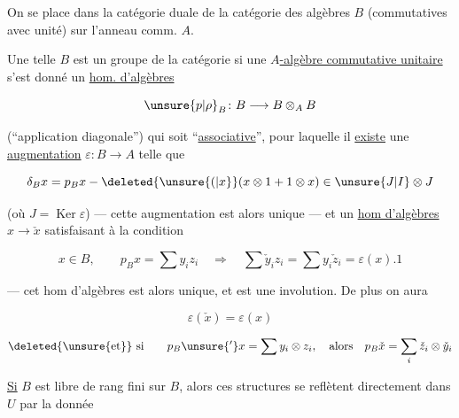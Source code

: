 


On se place dans la catégorie duale de la catégorie des algèbres $B$ (commutatives avec unité) sur l'anneau comm. $A$.


Une telle $B$ est un groupe de la catégorie si  une \uline{$A$-algèbre commutative unitaire} s'est donné un \uline{hom. d'algèbres}

\[
\unsure{p|\rho}_{B}\colon B\longrightarrow B\otimes_A B
\]

(``application diagonale'') qui soit ``\uline{associative}'', pour laquelle il \uline{existe} une \uline{augmentation}  $\varepsilon:B\to A$  telle que

\[
\delta_B x=p_Bx-\deleted{\unsure{( |x}}(x\otimes1+1\otimes x)\in\unsure{J|I}\otimes J
\]

(où $J=\operatorname{Ker}\varepsilon$) --- cette augmentation est alors unique --- et un \uline{hom d'algèbres} $x\longrightarrow\check{x}$ satisfaisant à la condition

\[
x\in B,\qquad p_Bx=\sum y_i z_i\quad\Longrightarrow\quad \sum\check{y}_i z_i=\sum y_i\check{z}_i=\varepsilon(x).1
\]

--- cet hom d'algèbres est alors unique, et est une involution. De plus on aura

\[
\varepsilon(\check{x})=\varepsilon(x)
\]

\[
\text{\deleted{\unsure{et}} si}\qquad p_B\unsure{'}x=\sum y_i\otimes z_i,\quad\text{alors}\quad p_B\check{x}=\sum_i\check{z}_i\otimes\check{y}_i
\]

\uline{Si} $B$ est libre de rang fini sur $B$, alors ces structures se reflètent directement dans $U$ par la donnée 

